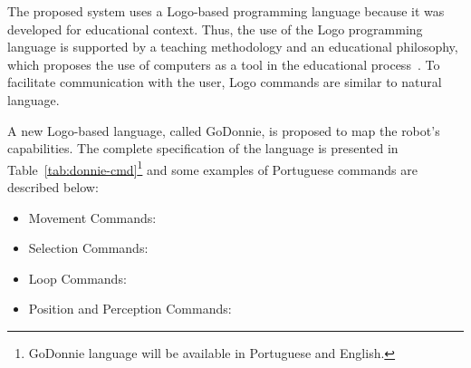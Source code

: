 The proposed system uses a Logo-based programming language because it was developed for educational context. Thus, the use of the Logo programming language is supported by a teaching methodology and an educational philosophy, which proposes the use of computers as a tool in the educational process~\cite{Valente1996}. To facilitate communication with the user, Logo commands are similar to natural language.

A new Logo-based language, called GoDonnie, is proposed to map the robot's capabilities. The complete specification of the language is presented in Table~\ref{tab:donnie-cmd}\footnote{GoDonnie language will be available in Portuguese and English.} and some examples of Portuguese commands are described below:


\begin{itemize}[topsep=0pt,itemsep=0ex,partopsep=0ex,parsep=0ex]
    \item Movement Commands:
    \item Selection Commands: 
    \item Loop Commands: 
    \item Position and Perception Commands:

\end{itemize}
